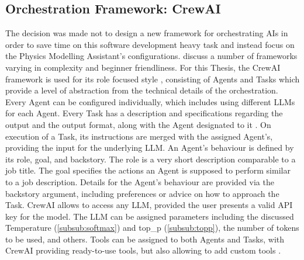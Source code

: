 \documentclass[
	fontsize = 11pt,
	paper = a4,
	draft = false,
	twoside = true,
	titlepage = false
]{scrartcl}
\numberwithin{equation}{subsection}
\begin{document}
	\subsection{Orchestration Framework: CrewAI} \label{sub:crewAi}
	The decision was made not to design a new framework for orchestrating \gls{AI}s in order to save time on this software development heavy task and instead focus on the Physics Modelling Assistant's configurations. \citeauthor{orchFrameworks} \autocite{orchFrameworks} discuss a number of frameworks varying in complexity and beginner friendliness. For this Thesis, the CrewAI \autocite{crewAi} framework is used for its role focused style \autocite{orchFrameworks}, consisting of \glspl{Agent} and Tasks \autocite{crewAi} which provide a level of abstraction from the technical details of the orchestration. Every \gls{Agent} can be configured individually, which includes using different \gls{LLM}s for each \gls{Agent}. Every Task has a description and specifications regarding the output and the output format, along with the \gls{Agent} designated to it \autocite{taskPy}. On execution of a Task, its instructions are merged with the assigned \gls{Agent}'s, providing the input for the underlying \gls{LLM}. An \gls{Agent}'s behaviour is defined by its role, goal, and backstory. The role is a very short description comparable to a job title. The goal specifies the actions an \gls{Agent} is supposed to perform similar to a job description. Details for the \gls{Agent}'s behaviour are provided via the backstory argument, including preferences or advice on how to approach the Task. CrewAI allows to access any \gls{LLM}, provided the user presents a valid \gls{API key} for the model. The \gls{LLM} can be assigned parameters including the discussed Temperature (\autoref{subsub:softmax}) and top\_p (\autoref{subsub:topp}), the number of \glspl{token} to be used, and others. Tools can be assigned to both \glspl{Agent} and Tasks, with CrewAI providing ready-to-use tools, but also allowing to add custom tools \autocite{crewaiTool}.
\end{document}
